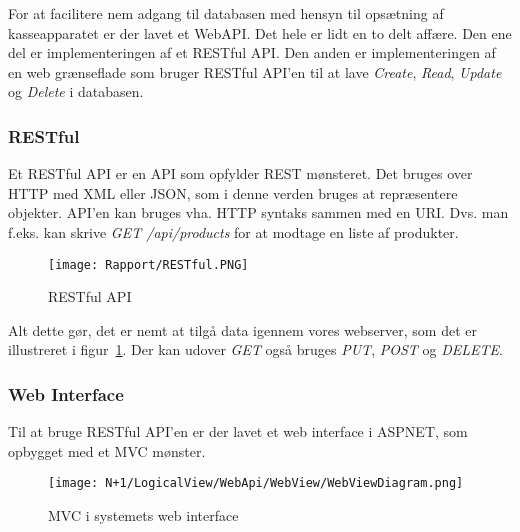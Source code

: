 For at facilitere nem adgang til databasen med hensyn til 
opsætning af kasseapparatet er der lavet et \gls{WebAPI}. 
Det hele er lidt en to delt affære. Den ene del er implementeringen af et \gls{RESTful} \gls{API}. 
Den anden er implementeringen af en web grænseflade som bruger \gls{RESTful} \gls{API}'en til at lave \textit{Create}, \textit{Read}, \textit{Update} og \textit{Delete} i databasen.

\subsubsection{RESTful}
Et \gls{RESTful} \gls{API} er en \gls{API} som opfylder \gls{REST} mønsteret. Det bruges over \gls{HTTP} med XML eller JSON, som i denne verden bruges at repræsentere objekter.
\gls{API}'en kan bruges vha. \gls{HTTP} syntaks sammen med en \gls{URI}. Dvs. man f.eks. kan skrive \textit{GET /api/products} for at modtage en liste af produkter. 

\begin{figure}[H]
    \centering
	\texttt{[image: Rapport/RESTful.PNG]}
	\caption{RESTful API}
	\label{fig:RESTfulApi}
\end{figure} 

Alt dette gør, det er nemt at tilgå data igennem vores webserver, som det er illustreret i figur~\ref{fig:RESTfulApi}. Der kan udover \textit{GET} også bruges \textit{PUT}, \textit{POST} og \textit{DELETE}. 

\subsubsection{Web Interface}
Til at bruge \gls{RESTful} \gls{API}'en er der lavet et web interface i \gls{ASPNET}, som opbygget med et \gls{MVC} mønster.

\begin{figure}[H]
    \centering
	\texttt{[image: N+1/LogicalView/WebApi/WebView/WebViewDiagram.png]}
	\caption{MVC i systemets web interface}
	\label{fig:MVCWebApi}
\end{figure}

